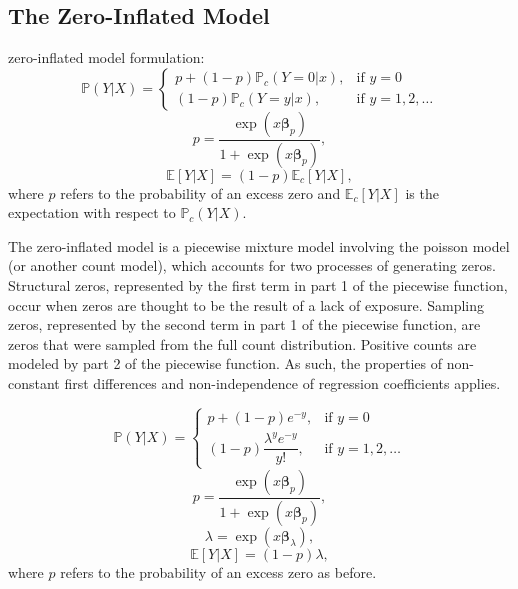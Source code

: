 \documentclass[jou, apacite]{apa6}
\begin{document}
\subsection{The Zero-Inflated Model}

zero-inflated model formulation:
\begin{equation}
\mathbb{P}(Y|X) =
  \begin{cases}
    p + (1 - p)\mathbb{P}_c(Y = 0|x), & \text{if } y = 0 \\
    (1 - p) \mathbb{P}_c(Y = y|x), & \text{if } y = 1, 2, \dots
  \end{cases}
\end{equation}
\begin{equation}
p = \dfrac{\exp (x \bm{\beta}_{p})}{1 + \exp (x \bm{\beta}_{p})},
\end{equation}
\begin{equation}
\mathbb{E}[Y|X] = (1 - p)\mathbb{E}_c[Y|X], %
\end{equation}
where $p$ refers to the probability of an excess zero and $\mathbb{E}_c[Y|X]$ is the expectation with respect to $\mathbb{P}_c(Y|X)$.

The zero-inflated model is a piecewise mixture model involving the poisson model (or another count model), which accounts for two processes of generating zeros. Structural zeros, represented by the first term in part 1 of the piecewise function, occur when zeros are thought to be the result of a lack of exposure. Sampling zeros, represented by the second term in part 1 of the piecewise function, are zeros that were sampled from the full count distribution. Positive counts are modeled by part 2 of the piecewise function. As such, the properties of non-constant first differences and non-independence of regression coefficients applies. 


\begin{equation} \label{zip1}
\mathbb{P}(Y|X) =
  \begin{cases}
    p + (1 - p)e^{-y}, & \text{if } y = 0 \\
    (1 - p) \dfrac{\lambda^{y}e^{-y}}{y!}, & \text{if } y = 1, 2, \dots
  \end{cases}
\end{equation}
\begin{equation} \label{zip2}
p = \dfrac{\exp (x \bm{\beta}_{p})}{1 + \exp (x \bm{\beta}_{p})},
\end{equation}
\begin{equation} \label{zip3}
\lambda = \exp (x \bm{\beta}_{\lambda}),
\end{equation}
\begin{equation} \label{zip4}
\mathbb{E}[Y|X] = (1 - p)\lambda,
\end{equation}
where $p$ refers to the probability of an excess zero as before.
\end{document}
